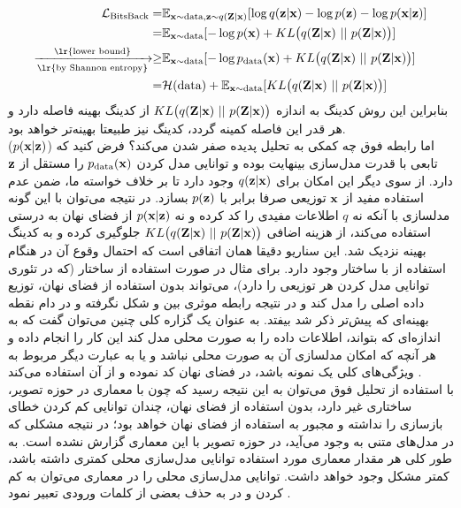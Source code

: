 \begin{align}
	\mathcal{L}_{\text{BitsBack}} =
	                                                                           & \expected_{\bff{x} \sim \text{data}, \bff{z} \sim q(\bff{Z}|\bff{x})} [\log q(\bff{z}|\bff{x}) -\log p(\bff{z}) - \log p(\bff{x}|\bff{z})] \nonumber
	\\
	=
	                                                                           & \expected_{\bff{x} \sim \text{data}} [-\log p(\bff{x}) + KL\big(q(\bff{Z}|\bff{x}) ~||~ p(\bff{Z}|\bff{x})\big)] \nonumber
	\\
	\xrightarrow[\text{\lr{by Shannon entropy}}]{\text{\lr{lower bound}}} \geq & \expected_{\bff{x} \sim \text{data}} [-\log p_{\text{data}}(\bff{x}) + KL\big(q(\bff{Z}|\bff{x}) ~||~ p(\bff{Z}|\bff{x})\big)] \nonumber
	\\
	=
	                                                                           & \mathcal{H}(\text{data}) + \expected_{\bff{x} \sim \text{data}} [KL\big(q(\bff{Z}|\bff{x}) ~||~ p(\bff{Z}|\bff{x})\big)]
\end{align}
بنابراین این روش کدینگ به اندازه
$KL\big(q({\bf Z}|{\bf x}) ~||~ p({\bf Z}|{\bf x})\big)$
از کدینگ بهینه فاصله دارد و هر قدر این فاصله کمینه گردد، کدینگ نیز طبیعتا بهینه‌تر خواهد بود. \\
اما رابطه فوق چه کمکی به تحلیل پدیده صفر شدن  می‌کند؟ فرض کنید که \decoder{}
($p({\bf x}|{\bf z})$)
تابعی با قدرت مدل‌سازی بینهایت بوده و توانایی مدل کردن $p_{\text{data}}({\bf x})$ را مستقل از ${\bf z}$ دارد. از سوی دیگر این امکان برای $q({\bf z}|{\bf x})$ وجود دارد تا بر خلاف خواسته ما، ضمن عدم استفاده مفید از ${\bf x}$ توزیعی صرفا برابر با $p({\bf z})$ بسازد. در نتیجه می‌توان با این گونه مدلسازی با آنکه نه $q$ اطلاعات مفیدی را کد کرده و نه $p({\bf x}|{\bf z})$ از فضای نهان به درستی استفاده می‌کند، از هزینه اضافی
$KL\big(q({\bf Z}|{\bf x}) ~||~ p({\bf Z}|{\bf x})\big)$
جلوگیری کرده و به کدینگ بهینه نزدیک شد. این سناریو دقیقا همان اتفاقی است که احتمال وقوع آن در هنگام استفاده از \decoder{} با ساختار \autoregressive{} وجود دارد. برای مثال در صورت استفاده از ساختار \lstm{} (که در تئوری توانایی مدل کردن هر توزیعی را دارد)، \decoder{} می‌تواند بدون استفاده از فضای نهان، توزیع داده اصلی را مدل کند و در نتیجه رابطه موثری بین \decoder{} و \encoder{} شکل نگرفته و در دام نقطه بهینه‌ای که پیش‌تر ذکر شد بیفتد. به عنوان یک گزاره کلی چنین می‌توان گفت که \decoder{} به اندازه‌ای که بتواند، اطلاعات داده را به صورت محلی مدل کند این کار را انجام داده و هر آنچه که امکان مدلسازی آن به صورت محلی نباشد و یا به عبارت دیگر مربوط به ویژگی‌های کلی یک نمونه باشد، در فضای نهان کد نموده و از آن استفاده می‌کند \cite{vae_lossy}.
\\
با استفاده از تحلیل فوق می‌توان به این نتیجه رسید که چون \vae{} با معماری \cnn{} در حوزه تصویر، ساختاری  غیر \autoregressive{} دارد، بدون استفاده از فضای نهان، چندان توانایی کم کردن خطای بازسازی را نداشته و مجبور به استفاده از فضای نهان خواهد بود؛ در نتیجه مشکلی که در مدل‌های متنی به وجود می‌آید، در حوزه تصویر با این معماری گزارش نشده است. به طور کلی هر مقدار معماری مورد استفاده توانایی مدل‌سازی محلی کمتری داشته باشد، کمتر مشکل وجود خواهد داشت. توانایی مدل‌سازی محلی را در معماری \cnn{} می‌توان به کم کردن \receiptivefield{} و در \lstm{} به حذف بعضی از کلمات ورودی تعبیر نمود \cite{vae_lossy, vae_dialated, vae_hybrid}.

